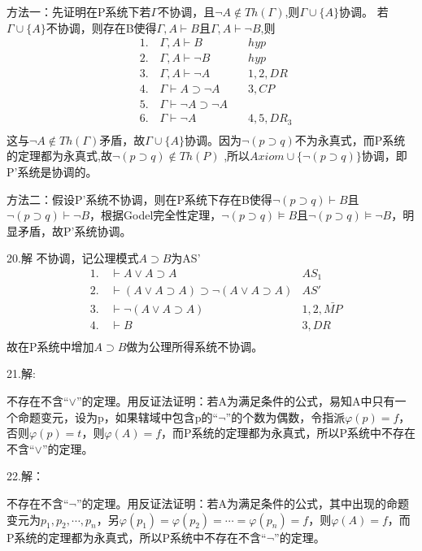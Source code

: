 \documentclass[a4paper]{ctexart}
\begin{document}
方法一：先证明在P系统下若$\Gamma$不协调，且$\neg A\not\in Th(\Gamma)$,则$\Gamma\cup \{A\}$协调。
若$\Gamma\cup \{A\}$不协调，则存在B使得$\Gamma,A\vdash B$且$\Gamma,A\vdash \neg B$,则
\begin{align*}
  &1.\quad \Gamma,A\vdash B \quad & hyp \\
  &2.\quad \Gamma,A\vdash \neg B \quad & hyp \\
  &3.\quad \Gamma,A\vdash \neg A \quad & 1,2,DR\\
  &4.\quad \Gamma\vdash A\supset \neg A \quad&  3,CP\\
  &5.\quad \Gamma\vdash \neg A\supset \neg A  \quad & \\
  &6.\quad \Gamma\vdash \neg A \quad & 4,5,DR_3\\
\end{align*}这与$\neg A\not\in Th(\Gamma)$矛盾，故$\Gamma\cup \{A\}$协调。因为$\neg(p\supset q)$不为永真式，而P系统的定理都为永真式,故$\neg(p\supset q)\not\in Th(P)$ ,所以$Axiom\cup\{\neg(p\supset q)\}$协调，即P'系统是协调的。

方法二：假设P'系统不协调，则在P系统下存在B使得$\neg(p\supset q)\vdash B$且$\neg(p\supset q)\vdash \neg B$，根据Godel完全性定理，$\neg(p\supset q)\models B$且$\neg(p\supset q)\models \neg B$，明显矛盾，故P'系统协调。\newline

\noindent 20.解
不协调，记公理模式$A\supset B$为AS'
\begin{align*}
  &1.\quad \vdash A\vee A\supset A &AS_{1} \\
  &2.\quad \vdash (A\vee A\supset A)\supset \neg(A\vee A\supset A)&AS' \\
  &3.\quad \vdash \neg(A\vee A\supset A) &1,2,\bar{MP} \\
  &4.\quad \vdash B &3,DR \\
\end{align*}
故在P系统中增加$A\supset B$做为公理所得系统不协调。\newline

\noindent 21.解:

不存在不含“$\vee$”的定理。用反证法证明：若A为满足条件的公式，易知A中只有一个命题变元，设为p，如果辖域中包含p的“$\neg$”的个数为偶数，令指派$\varphi(p)=f$，否则$\varphi(p)=t$，则$\varphi(A)=f$，而P系统的定理都为永真式，所以P系统中不存在不含“$\vee$”的定理。\newline

\noindent 22.解：

不存在不含“$\neg$”的定理。用反证法证明：若A为满足条件的公式，其中出现的命题变元为$p_1,p_2,\cdots,p_n$，另$\varphi(p_1)=\varphi(p_2)=\cdots=\varphi(p_n)=f$，则$\varphi(A)=f$，而P系统的定理都为永真式，所以P系统中不存在不含“$\neg$”的定理。\newline
\end{document}
